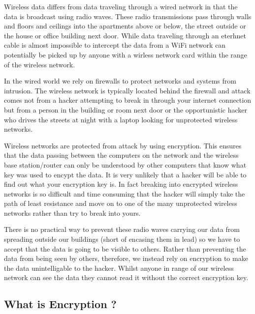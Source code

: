 Wireless data differs from data traveling through a wired network in that the
data is broadcast using radio waves. These radio transmissions pass through
walls and floors and ceilings into the apartments above or below, the street
outside or the house or office building next door. While data traveling through
an eterhnet cable is almost impossible to intercept the data from a WiFi network
can potentially be picked up by anyone with a wirless network card within the
range of the wireless network.



In the wired world we rely on firewalls to protect networks and systems from
intrusion. The wireless network is typically located behind the firewall and
attack comes not from a hacker attempting to break in through your internet
connection but from a person in the building or room next door or the
opportunistic hacker who drives the streets at night with a laptop looking for
unprotected wireless networks.



Wireless networks are protected from attack by using encryption. This ensures
that the data passing between the computers on the network and the wireless base
station/router can only be understood by other computers that know what key was
used to encypt the data. It is very unlikely that a hacker will be able to find
out what your encryption key is. In fact breaking into encrypted wireless
networks is so difficult and time consuming that the hacker will simply take the
path of least resistance and move on to one of the many unprotected wireless
networks rather than try to break into yours.



There is no practical way to prevent these radio waves carrying our data from
spreading outside our buildings (short of encasing them in lead) so we have to
accept that the data is going to be visible to others. Rather than preventing
the data from being seen by others, therefore, we instead rely on encryption to
make the data unintelligable to the hacker. Whilst anyone in range of our
wireless network can see the data they cannot read it without the correct
encryption key.



\subsectionend

\subsection{What is Encryption ?}
\label{ssec:what_is_encryption_}

